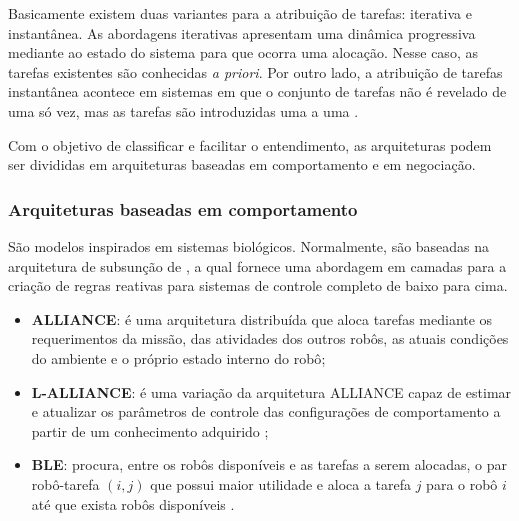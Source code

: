             Basicamente existem duas variantes para a atribuição de tarefas: iterativa e instantânea. As abordagens iterativas apresentam uma dinâmica progressiva mediante ao estado do sistema para que ocorra uma alocação. Nesse caso, as tarefas existentes são conhecidas \textit{a priori}. Por outro lado, a atribuição de tarefas instantânea acontece em sistemas em que o conjunto de tarefas não é revelado de uma só vez, mas as tarefas são introduzidas uma a uma \cite{ref:gerkey2004taxonomy}.
            
            Com o objetivo de classificar e facilitar o entendimento, as arquiteturas podem ser divididas em arquiteturas baseadas em comportamento e em negociação.
        
            \subsubsection{Arquiteturas baseadas em comportamento} \label{subsec:arch_comportamento}
                São modelos inspirados em sistemas biológicos. Normalmente, são baseadas na arquitetura de subsunção de , a qual fornece uma abordagem em camadas para a criação de regras reativas para sistemas de controle completo de baixo para cima.
            
                \begin{itemize}
                    \item \textbf{ALLIANCE}: é uma arquitetura distribuída que aloca tarefas mediante os requerimentos da missão, das atividades dos outros robôs, as atuais condições do ambiente e o próprio estado interno do robô\cite{ref:parker1998alliance};
                    
                    \item \textbf{L-ALLIANCE}: é uma variação da arquitetura ALLIANCE capaz de estimar e atualizar os parâmetros de controle das configurações de comportamento a partir de um conhecimento adquirido \cite{ref:parker1996lalliance};
                    
                    \item \textbf{BLE}: procura, entre os robôs disponíveis e as tarefas a serem alocadas, o par robô-tarefa $(i, j)$ que possui maior utilidade e aloca a tarefa $j$ para o robô $i$ até que exista robôs disponíveis \cite{ref:werger2000ble}.
                \end{itemize}
            
